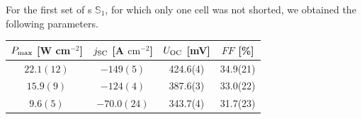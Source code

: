 \documentclass[a4paper,10pt,twocolumn]{article}
\begin{document}
\begin{extract*}
For the first set of \BHSC s $\mathbb{S}_1$, for which only one cell was not shorted, we obtained the following parameters.
\begin{table}[]
	\begin{tabular}{@{}lclc@{}}
		\toprule
		\multicolumn{1}{c}{$P_{\text{max}}$ [\textmu W cm$^{-2}$]} & $j_{\text{SC}}$ [\textmu A $\mathrm{cm}^{-2}$] & \multicolumn{1}{c}{$U_{\text{OC}}$ [mV]} & $FF$ [\%] \\ \midrule
		\multicolumn{1}{c}{$ 22.1(12) $}                  & $ -149(5) $                           & \multicolumn{1}{c}{424.6(4)}    & 34.9(21)  \\
		\multicolumn{1}{c}{$ 15.9(9) $}                   & $ -124(4) $                           & \multicolumn{1}{c}{387.6(3)}    & 33.0(22)  \\
		\multicolumn{1}{c}{$ 9.6(5) $}                    & $ -70.0(24) $                         & \multicolumn{1}{c}{343.7(4)}    & 31.7(23)  \\

\end{tabular}
\end{table}
\end{extract*}
\end{document}
